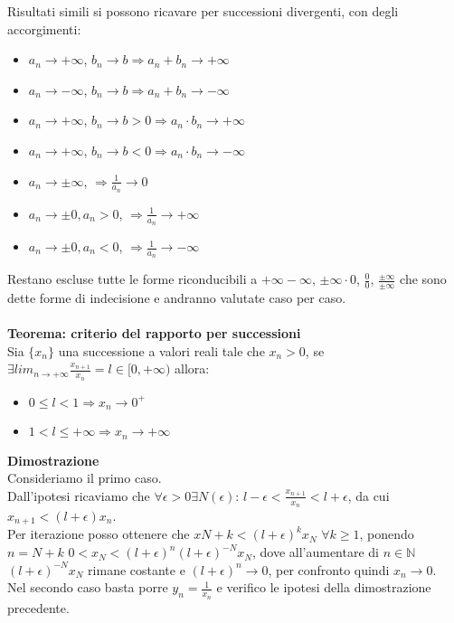 \documentclass{article}
\begin{document}
Risultati simili si possono ricavare per successioni divergenti, con degli accorgimenti:
\begin{itemize}
    \item $a_n\rightarrow+\infty$, $b_n\rightarrow b\Rightarrow a_n+b_n\rightarrow+\infty$
    \item $a_n\rightarrow-\infty$, $b_n\rightarrow b\Rightarrow a_n+b_n\rightarrow-\infty$
    \item $a_n\rightarrow+\infty$, $b_n\rightarrow b>0\Rightarrow a_n\cdot b_n\rightarrow+\infty$
    \item $a_n\rightarrow+\infty$, $b_n\rightarrow b<0\Rightarrow a_n\cdot b_n\rightarrow-\infty$
    \item $a_n\rightarrow\pm\infty$, $\Rightarrow \frac{1}{a_n}\rightarrow0$
    \item $a_n\rightarrow\pm0, a_n>0$, $\Rightarrow \frac{1}{a_n}\rightarrow+\infty$
    \item $a_n\rightarrow\pm0, a_n<0$, $\Rightarrow \frac{1}{a_n}\rightarrow-\infty$
\end{itemize}
Restano escluse tutte le forme riconducibili a $+\infty-\infty$, $\pm\infty\cdot0$, $\frac{0}{0}$, $\frac{\pm\infty}{\pm\infty}$ che sono dette forme di indecisione e andranno valutate caso per caso.\\\\
\textbf{Teorema: criterio del rapporto per successioni}\\
Sia $\{x_n\}$ una successione a valori reali tale che $x_n>0$, se $\exists lim_{n\rightarrow+\infty}\frac{x_{n+1}}{x_n}=l\in[0,+\infty)$ allora:
\begin{itemize}
    \item $0\leq l<1\Rightarrow x_n\rightarrow 0^+$
    \item $1<l\leq+\infty\Rightarrow x_n\rightarrow+\infty$
\end{itemize}
\textbf{Dimostrazione}\\
Consideriamo il primo caso.\\
Dall'ipotesi ricaviamo che $\forall\epsilon>0\exists N(\epsilon)$: $l-\epsilon<\frac{x_{n+1}}{x_n}<l+\epsilon$, da cui $x_{n+1}<(l+\epsilon)x_n$.\\
Per iterazione posso ottenere che $x{N+k}<(l+\epsilon)^kx_N$ $\forall k\geq1$, ponendo $n=N+k$ $0<x_N<(l+\epsilon)^n(l+\epsilon)^{-N}x_N$, dove all'aumentare di $n\in\mathds{N}$ $(l+\epsilon)^{-N}x_N$ rimane costante e $(l+\epsilon)^n\rightarrow 0$, per confronto quindi $x_n\rightarrow 0$.\\
Nel secondo caso basta porre $y_n=\frac{1}{x_n}$ e verifico le ipotesi della dimostrazione precedente.\\
\end{document}
